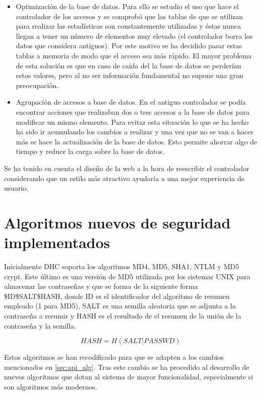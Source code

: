\begin{itemize}
	\item Optimización de la base de datos. Para ello se estudio el uso que hace el controlador de los accesos y se comprobó que las tablas de que se utilizan para realizar las estadísticas son constantemente utilizadas y éstas nunca llegan a tener un número de elementos muy elevado (el controlador borra los datos que considera antiguos). Por este motivo se ha decidido pasar estas tablas a memoria de modo que el acceso sea más rápido. El mayor problema de esta solución es que en caso de caída del la base de datos se perderían estos valores, pero al no ser información fundamental no supone una gran preocupación.
	
	\item Agrupación de accesos a base de datos. En el antiguo controlador se podía encontrar acciones que realizaban dos o tres accesos a la base de datos para modificar un mismo elemento. Para evitar esta situación lo que se ha hecho ha sido ir acumulando los cambios a realizar y una vez que no se van a hacer más se hace la actualización de la base de datos. Esto permite ahorrar algo de tiempo y reduce la carga sobre la base de datos.
\end{itemize}

Se ha tenido en cuenta el diseño de la web a la hora de reescribir el controlador considerando que un estilo más atractivo ayudaría a una mejor experiencia de usuario.

\section{Algoritmos nuevos de seguridad implementados}

Inicialmente DHC soporta los algoritmos MD4, MD5, SHA1, NTLM y MD5 crypt. Este último es una versión de MD5 utilizada por los sistemas UNIX para almacenar las contraseñas y que se forma de la siguiente forma \$ID\$SALT\$HASH, donde ID es el identificador del algoritmo de resumen empleado (1 para MD5), SALT es una semilla aleatoria que se adjunta a la contraseña a resumir y HASH es el resultado de el resumen de la unión de la contraseña y la semilla.

$$HASH = H(SALT | PASSWD)$$

Estos algoritmos se han recodificado para que se adapten a los cambios mencionados en \ref{sec:api_alg}. Tras este cambio se ha procedido al desarrollo de nuevos algoritmos que dotan al sistema de mayor funcionalidad, especialmente si son algoritmos más modernos.


